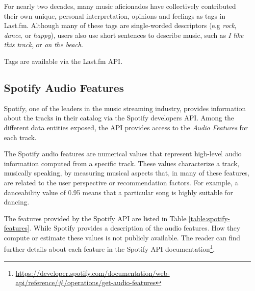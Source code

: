 \documentclass[sn-mathphys]{sn-jnl}%
\theoremstyle{thmstyleone}%
\theoremstyle{thmstyletwo}%
\theoremstyle{thmstylethree}%
\begin{document}
For nearly two decades, many music aficionados have collectively contributed their own unique, personal interpretation, opinions and feelings
as tags in Last.fm.
Although many of these tags are single-worded descriptors (e.g \emph{rock}, \emph{dance}, or \emph{happy}),
users also use short sentences to describe music, such as \emph{I like this track}, or \emph{on the beach}.

Tags are available via the Last.fm API.

\subsection{Spotify Audio Features}

Spotify, one of the leaders in the music streaming industry, provides information about the tracks in their catalog via the Spotify developers API.
Among the different data entities exposed, the API provides access to the \emph{Audio Features} for each track.

The Spotify audio features are numerical values that represent high-level audio information computed from a specific
track. These values characterize a track, musically speaking,
by measuring musical aspects that, in many of these features, are related to the user perspective or recommendation factors.
For example, a danceability value of 0.95 means
that a particular song is highly suitable for dancing.

The features provided by the Spotify API are listed in
Table \ref{table:spotify-features}.
While Spotify provides a description of the audio features.
How they compute or estimate these values is not publicly available.
The reader can find further details about each feature in the Spotify API documentation\footnote[5]{
      \url{https://developer.spotify.com/documentation/web-api/reference/\#/operations/get-audio-features}
}.
\end{document}

